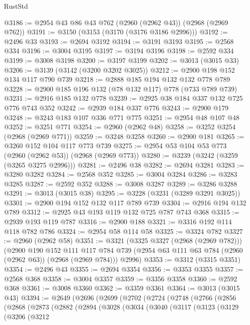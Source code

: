 \begin{lexlean}{RustStd}
\begin{coremodule}
@3186 := @2954 @43 @86 @43 @762 (@2960 (@2962 @43)) (@2968 (@2969 @762))
@3191 := @3150 (@3153 (@3170 (@3176 @3186 @2996)))
@3192 := @2496 @33
@3193 := @2694 @3192
@3194 := @3191 @3193
@3195 := @2568 @334
@3196 := @3004 @3195
@3197 := @3194 @3196
@3198 := @2592 @334
@3199 := @3008 @3198
@3200 := @3197 @3199
@3202 := @3013 (@3015 @33)
@3206 := @3139 (@3142 (@3200 @3202 @3025))
@3212 := @2900 @198 @152 @134 @117 @790 @739
@3218 := @2888 @185 @194 @132 @132 @778 @789
@3228 := @2900 @185 @196 @132 (@78 @132 @117) @778 (@733 @789 @739)
@3231 := @2916 @185 @132 @778
@3239 := @2925 @38 @184 @337 @132 @725 @776 @743 @352
@3242 := @2939 @184 @337 @776
@3243 := @2900 @179
@3248 := @3243 @183 @107 @336 @771 @775
@3251 := @2954 @48 @107 @48
@3252 := @3251 @771
@3254 := @2960 (@2962 @48)
@3258 := @3252 @3254 (@2968 (@2969 @771))
@3259 := @3248 @3258
@3260 := @2900 @181
@3265 := @3260 @152 @104 @117 @773 @739
@3275 := @2954 @53 @104 @53 @773 (@2960 (@2962 @53)) (@2968 (@2969 @773))
@3280 := @3239 (@3242 (@3259 (@3265 @3275 @2996)))
@3281 := @2496 @38
@3282 := @2694 @3281
@3283 := @3280 @3282
@3284 := @2568 @352
@3285 := @3004 @3284
@3286 := @3283 @3285
@3287 := @2592 @352
@3288 := @3008 @3287
@3289 := @3286 @3288
@3291 := @3013 (@3015 @38)
@3295 := @3228 (@3231 (@3289 @3291 @3025))
@3301 := @2900 @194 @152 @132 @117 @789 @739
@3304 := @2916 @194 @132 @789
@3312 := @2925 @43 @193 @119 @132 @725 @787 @743 @368
@3315 := @2939 @193 @119 @787
@3316 := @2900 @188
@3321 := @3316 @192 @114 @118 @782 @786
@3324 := @2954 @58 @114 @58
@3325 := @3324 @782
@3327 := @2960 (@2962 @58)
@3351 := @3321
    (@3325 @3327 (@2968 (@2969 @782)))
    (@2900
      @190
      @152
      @111
      @117
      @784
      @739
      (@2954 @63 @111 @63 @784 (@2960 (@2962 @63)) (@2968 (@2969 @784)))
      @2996)
@3353 := @3312 (@3315 @3351)
@3354 := @2496 @43
@3355 := @2694 @3354
@3356 := @3353 @3355
@3357 := @2568 @368
@3358 := @3004 @3357
@3359 := @3356 @3358
@3360 := @2592 @368
@3361 := @3008 @3360
@3362 := @3359 @3361
@3364 := @3013 (@3015 @43)
@3394 := @2649
    (@2696
      (@2699
        (@2702
          (@2724
            (@2748
              (@2766
                (@2856
                  (@2868
                    (@2873
                      (@2882
                        (@2894
                          (@3028
                            (@3034
                              (@3040
                                (@3117
                                  (@3123
                                    (@3129
                                      (@3206
                                        (@3212

\end{coremodule}
\end{lexlean}
